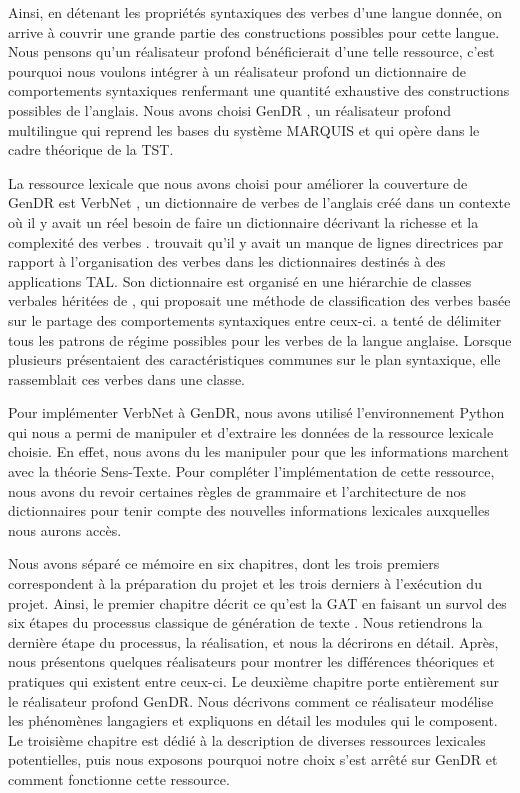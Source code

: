 Ainsi, en détenant les propriétés syntaxiques des verbes d'une langue donnée, on arrive à couvrir une grande partie des constructions possibles pour cette langue. Nous pensons qu'un réalisateur profond bénéficierait d'une telle ressource, c'est pourquoi nous voulons intégrer à un réalisateur profond un dictionnaire de comportements syntaxiques renfermant une quantité exhaustive des constructions possibles de l'anglais. Nous avons choisi GenDR \citep{lareau18,lambrey15,LambreyGECOv1User2016,LambreyImplementationcollocationspour2017,dubinskaite17}, un réalisateur profond multilingue qui reprend les bases du système MARQUIS et qui opère dans le cadre théorique de la \ac{TST}.

La ressource lexicale que nous avons choisi pour améliorer la couverture de GenDR est VerbNet \citep{SchulerVerbnetBroadcoverageComprehensive2005}, un dictionnaire de verbes de l'anglais créé dans un contexte où il y avait un réel besoin de faire un dictionnaire décrivant la richesse et la complexité des verbes \citep{KipperClassBasedConstructionVerb2000}. \cite{SchulerVerbnetBroadcoverageComprehensive2005} trouvait qu'il y avait un manque de lignes directrices par rapport à l'organisation des verbes dans les dictionnaires destinés à des applications \ac{TAL}. Son dictionnaire est organisé en une hiérarchie de classes verbales héritées de \cite{verb-classes.levin.1993}, qui proposait une méthode de classification des verbes basée sur le partage des comportements syntaxiques entre ceux-ci. \citeauthor{verb-classes.levin.1993} a tenté de délimiter tous les patrons de régime possibles pour les verbes de la langue anglaise. Lorsque plusieurs présentaient des caractéristiques communes sur le plan syntaxique, elle rassemblait ces verbes dans une classe.

Pour implémenter VerbNet à GenDR, nous avons utilisé l'environnement Python qui nous a permi de manipuler et d'extraire les données de la ressource lexicale choisie. En effet, nous avons du les manipuler pour que les informations marchent avec la théorie Sens-Texte. Pour compléter l'implémentation de cette ressource, nous avons du revoir certaines règles de grammaire et l'architecture de nos dictionnaires pour tenir compte des nouvelles informations lexicales auxquelles nous aurons accès.

Nous avons séparé ce mémoire en six chapitres, dont les trois premiers correspondent à la préparation du projet et les trois derniers à l'exécution du projet. Ainsi, le premier chapitre décrit ce qu'est la \ac{GAT} en faisant un survol des six étapes du processus classique de génération de texte \citep{ReiterBuildingNaturalLanguage2000}. Nous retiendrons la dernière étape du processus, la réalisation, et nous la décrirons en détail. Après, nous présentons quelques réalisateurs pour montrer les différences théoriques et pratiques qui existent entre ceux-ci. Le deuxième chapitre porte entièrement sur le réalisateur profond GenDR. Nous décrivons comment ce réalisateur modélise les phénomènes langagiers et expliquons en détail les modules qui le composent. Le troisième chapitre est dédié à la description de diverses ressources lexicales potentielles, puis nous exposons pourquoi notre choix s'est arrêté sur GenDR et comment fonctionne cette ressource.

